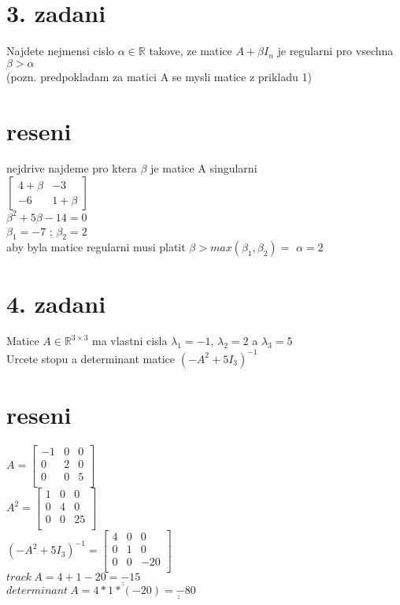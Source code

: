 \documentclass[a4paper]{article}
\def\doubleunderline#1{\underline{\underline{#1}}}
\begin{document}
\section*{3. zadani}
Najdete nejmensi cislo $\alpha \in \mathbb{R}$ takove, ze matice 
$A+\beta I_n$ je regularni pro vsechna $\beta > \alpha$\\
(pozn. predpokladam za matici A se mysli matice z prikladu 1)

\section*{reseni}
nejdrive najdeme pro ktera $\beta$ je matice A singularni\\
$\left[\begin{matrix}
	4+\beta & -3\\
	-6 & 1+\beta
\end{matrix}\right]$\\
$\beta^2+5\beta-14=0$\\
$\beta_1 = -7$ ; $\beta_2 = 2$\\
aby byla matice regularni musi platit
$\beta > max(\beta_1, \beta_2) = $ \doubleunderline{$\alpha = 2$}\\













\section*{4. zadani}
Matice $A\in\mathbb{R}^{3\times3}$ ma vlastni cisla
$\lambda_1=-1$, $\lambda_2=2$ a $\lambda_3=5$\\
Urcete stopu a determinant matice $(-A^2+5I_3)^{-1}$ 

\section*{reseni}
$A=\left[\begin{matrix}
	-1 & 0 & 0\\
	0 & 2 & 0\\
	0 & 0 & 5\\
\end{matrix}\right]$\\
$A^2=\left[\begin{matrix}
	1 & 0 & 0\\
	0 & 4 & 0\\
	0 & 0 & 25\\
\end{matrix}\right]$\\
$(-A^2+5I_3)^{-1}=
\left[\begin{matrix}
	4 & 0 & 0\\
	0 & 1 & 0\\
	0 & 0 & -20\\
\end{matrix}\right]$\\
$track~A = 4+1-20\doubleunderline{=-15}$\\
$determinant~A = 4*1*(-20)\doubleunderline{=-80}$\\
\end{document}
